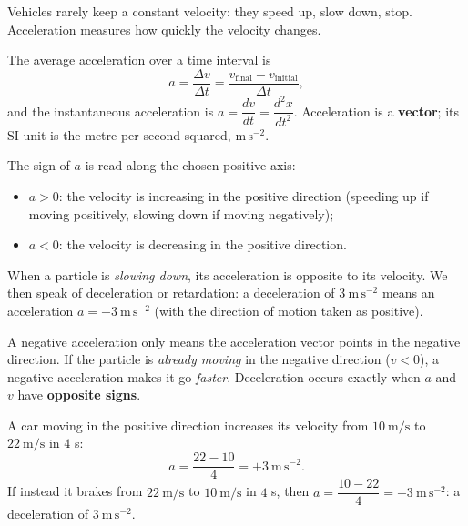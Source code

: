 \documentclass[11pt]{article}
\newcommand{\cle}[1]{{\popxbold\color{popdark}#1}}
\newcounter{popsec}
\newcounter{popsub}
\newcommand{\courssub}[1]{%
  \stepcounter{popsub}%
  \par\vspace{9pt}\noindent{\popxbold\fontsize{11.5}{13}\selectfont\color{popink}{\color{poporange}\thepopsec.\thepopsub}\hspace{6pt}#1}\par\nopagebreak\vspace{4pt}
}
\begin{document}
\courssub{Acceleration}

Vehicles rarely keep a constant velocity: they speed up, slow down, stop. \cle{Acceleration} measures how quickly the velocity changes.

\begin{definition}[Acceleration]
The \cle{average acceleration} over a time interval is
\[
a = \frac{\Delta v}{\Delta t} = \frac{v_{\text{final}} - v_{\text{initial}}}{\Delta t},
\]
and the instantaneous acceleration is $a = \dfrac{dv}{dt} = \dfrac{d^2x}{dt^2}$. Acceleration is a \textbf{vector}; its SI unit is the metre per second squared, $\mathrm{m\,s^{-2}}$.
\end{definition}

The sign of $a$ is read along the chosen positive axis:
\begin{itemize}
\item $a > 0$: the velocity is increasing in the positive direction (speeding up if moving positively, slowing down if moving negatively);
\item $a < 0$: the velocity is decreasing in the positive direction.
\end{itemize}

\begin{definition}
When a particle is \emph{slowing down}, its acceleration is opposite to its velocity. We then speak of \cle{deceleration} or \cle{retardation}: a deceleration of $3\ \mathrm{m\,s^{-2}}$ means an acceleration $a = -3\ \mathrm{m\,s^{-2}}$ (with the direction of motion taken as positive).
\end{definition}

\begin{attention}
A negative acceleration only means the acceleration vector points in the negative direction. If the particle is \emph{already moving} in the negative direction ($v<0$), a negative acceleration makes it go \emph{faster}. Deceleration occurs exactly when $a$ and $v$ have \textbf{opposite signs}.
\end{attention}

\begin{exemplebox}
A car moving in the positive direction increases its velocity from $10\ \mathrm{m/s}$ to $22\ \mathrm{m/s}$ in $4$ s:
\[
a = \frac{22 - 10}{4} = +3\ \mathrm{m\,s^{-2}}.
\]
If instead it brakes from $22\ \mathrm{m/s}$ to $10\ \mathrm{m/s}$ in $4$ s, then $a = \dfrac{10-22}{4} = -3\ \mathrm{m\,s^{-2}}$: a deceleration of $3\ \mathrm{m\,s^{-2}}$.
\end{exemplebox}
\end{document}
